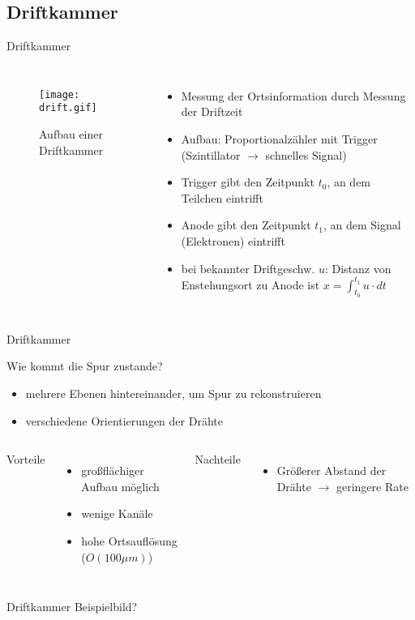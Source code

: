 \subsection[]{Driftkammer}

\begin{frame}{Driftkammer}
    \begin{columns}[T]
			\begin{figure}[htbp]
			  \centering
			  \texttt{[image: drift.gif]}
			  \caption{Aufbau einer Driftkammer}
			\end{figure}
			
	    	\begin{itemize}
	    	  \item Messung der Ortsinformation durch Messung der Driftzeit
			  \item Aufbau: Proportionalzähler mit Trigger (Szintillator $\rightarrow$ schnelles Signal)
			  \item Trigger gibt den Zeitpunkt $t_0$, an dem Teilchen eintrifft
			  \item Anode gibt den Zeitpunkt $t_1$, an dem Signal (Elektronen) eintrifft
			  \item bei bekannter Driftgeschw. $u$: Distanz von Enstehungsort zu Anode ist
			  $x=\int_{t_0}^{t_1}u\cdot dt$
			\end{itemize}
			
    \end{columns}
\end{frame}

\begin{frame}{Driftkammer}

	\begin{block}{Wie kommt die Spur zustande?}
		\begin{itemize}
		  \item mehrere Ebenen hintereinander, um Spur zu rekonstruieren
		  \item verschiedene Orientierungen der Drähte
		\end{itemize}
	\end{block}
	\vspace{0.8cm}
    \begin{columns}[T]
			Vorteile		
			\begin{itemize}
			  \item großflächiger Aufbau möglich
			  \item wenige Kanäle
			  \item hohe Ortsauflösung ($O(100\mu m)$)
			\end{itemize}	
	    	Nachteile
	    	\begin{itemize}
			  \item Größerer Abstand der Drähte $\rightarrow$ geringere Rate
			\end{itemize}
    \end{columns}
    \vspace{1cm}
\end{frame}

\begin{frame}{Driftkammer}
    Beispielbild?
\end{frame}